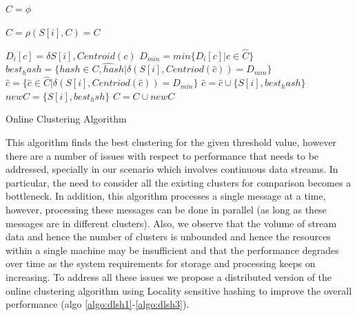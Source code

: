 \documentclass{article} %
\begin{document}
\begin{algorithm}
\SetAlgoLined
{}

	$C = \phi$ \;
	{
		$\hat{C} = \rho(S[i],C) = C$ \;
		
		
		{
			$D_i[c] = \delta{S[i],Centroid(c)}$\;
		}
		$D_{min} = min\lbrace D_i[c] | c \in \hat{C} \rbrace$\;
		$best_hash = \lbrace hash \in \hat{C,hash} | \delta(S[i],Centriod(\hat{c})) = D_{min} \rbrace$ \;
		$\hat{c} = \lbrace \hat{c} \in \hat{C} | \delta(S[i],Centriod(\hat{c})) = D_{min} \rbrace$ \;
		{
			$\hat{c} = \hat{c} \cup \lbrace S[i], best_hash \rbrace$ \;
		}
		{
			$newC = \lbrace S[i],  best_hsh \rbrace$ \;
			$ C = C \cup newC$ \;
		}
	}

\label{algo:online}
\caption{Online Clustering Algorithm}
\end{algorithm}

This algorithm finds the best clustering for the given threshold value, however there are a number of issues with respect to performance that needs to be addressed, specially in our scenario which involves continuous data streams. In particular, the need to consider all the existing clusters for comparison becomes a bottleneck. In addition, this algorithm processes a single message at a time, however, processing these messages can be done in parallel (as long as these messages are in different clusters). Also, we observe that the volume of stream data and hence the number of clusters is unbounded and hence the resources within a single machine may be insufficient and that the performance degrades over time as the system requirements for storage and processing keeps on increasing. To address all these issues we propose a distributed version of the online clustering algorithm using Locality sensitive hashing to improve the overall performance (algo \ref{algo:dlsh1}-\ref{algo:dlsh3}).
\end{document}
